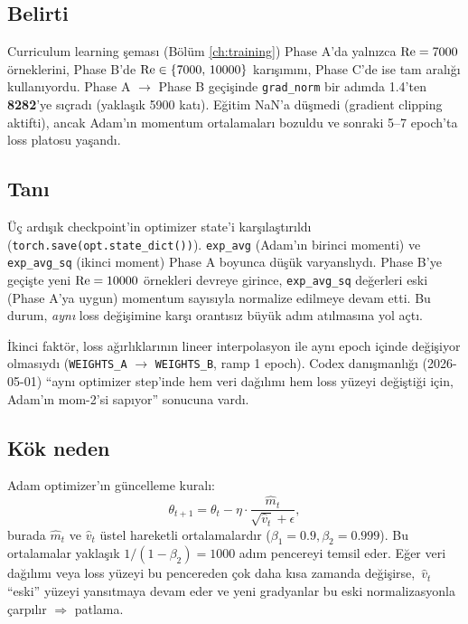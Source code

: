 \subsection*{Belirti}

Curriculum learning şeması (Bölüm \ref{ch:training}) Phase A'da yalnızca $\mathrm{Re} = 7000$ örneklerini, Phase B'de $\mathrm{Re} \in \{7000,\,10000\}$ karışımını, Phase C'de ise tam aralığı kullanıyordu. Phase A $\to$ Phase B geçişinde \texttt{grad\_norm} bir adımda 1.4'ten \textbf{8282}'ye sıçradı (yaklaşık 5900 katı). Eğitim NaN'a düşmedi (gradient clipping aktifti), ancak Adam'ın momentum ortalamaları bozuldu ve sonraki 5--7 epoch'ta loss platosu yaşandı.

\subsection*{Tanı}

Üç ardışık checkpoint'in optimizer state'i karşılaştırıldı (\texttt{torch.save(opt.state\_dict())}). \texttt{exp\_avg} (Adam'ın birinci momenti) ve \texttt{exp\_avg\_sq} (ikinci moment) Phase A boyunca düşük varyanslıydı. Phase B'ye geçişte yeni $\mathrm{Re} = 10000$ örnekleri devreye girince, \texttt{exp\_avg\_sq} değerleri eski (Phase A'ya uygun) momentum sayısıyla normalize edilmeye devam etti. Bu durum, \textit{aynı} loss değişimine karşı orantısız büyük adım atılmasına yol açtı.

İkinci faktör, loss ağırlıklarının lineer interpolasyon ile aynı epoch içinde değişiyor olmasıydı (\texttt{WEIGHTS\_A} $\to$ \texttt{WEIGHTS\_B}, ramp 1 epoch). Codex danışmanlığı (2026-05-01) ``aynı optimizer step'inde hem veri dağılımı hem loss yüzeyi değiştiği için, Adam'ın mom-2'si sapıyor'' sonucuna vardı.

\subsection*{Kök neden}

Adam optimizer'ın güncelleme kuralı:
\begin{equation}
    \theta_{t+1} = \theta_t - \eta \cdot \frac{\hat{m}_t}{\sqrt{\hat{v}_t} + \epsilon},
\end{equation}
burada $\hat{m}_t$ ve $\hat{v}_t$ üstel hareketli ortalamalardır ($\beta_1 = 0.9, \beta_2 = 0.999$). Bu ortalamalar yaklaşık $1/(1-\beta_2) = 1000$ adım pencereyi temsil eder. Eğer veri dağılımı veya loss yüzeyi bu pencereden çok daha kısa zamanda değişirse, \,$\hat{v}_t$ ``eski'' yüzeyi yansıtmaya devam eder ve yeni gradyanlar bu eski normalizasyonla çarpılır $\Rightarrow$ patlama.

